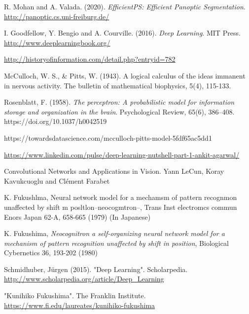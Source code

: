 

\begin{thebibliography}{}



 R. Mohan and A. Valada. (2020). \textit{EfficientPS: Efficient Panoptic Segmentation}. \url{http://panoptic.cs.uni-freiburg.de/}

 I. Goodfellow, Y. Bengio and A. Courville. (2016). \textit{Deep Learning}. MIT Press. \url{http://www.deeplearningbook.org/}



 \url{http://historyofinformation.com/detail.php?entryid=782}

 McCulloch, W. S., \& Pitts, W. (1943). A logical calculus of the ideas immanent in nervous activity. The bulletin of mathematical biophysics, 5(4), 115-133.

 Rosenblatt, F. (1958). \textit{The perceptron: A probabilistic model for information storage and organization in the brain}. Psychological Review, 65(6), 386–408. https://doi.org/10.1037/h0042519

 https://towardsdatascience.com/mcculloch-pitts-model-5fdf65ac5dd1

 \url{https://www.linkedin.com/pulse/deep-learning-nutshell-part-1-ankit-agarwal/}

 Convolutional Networks and Applications in Vision. Yann LeCun, Koray Kavukcuoglu and Cl\'ement Farabet


 K. Fukushlma, Neural network model for a mechamsm
of pattern recognmon unaffected by shift m
posltlon--neocogmtron--, Trans Inst electromcs commun
Enors Japan 62-A, 658-665 (1979) (In Japanese)

 K. Fukushima, \textit{Neocognitron a self-organizing neural
network model for a mechanism of pattern recognition
unaffected by shift in position}, Biological Cybernetics 36,
193-202 (1980)

 Schmidhuber, Jürgen (2015). "Deep Learning". Scholarpedia. \url{http://www.scholarpedia.org/article/Deep_Learning}

 "Kunihiko Fukushima". The Franklin Institute. \url{https://www.fi.edu/laureates/kunihiko-fukushima}


\end{thebibliography}
